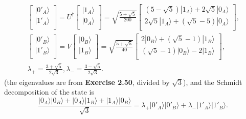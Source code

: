 \documentclass[a4paper,12pt]{article}
\newcommand{\ra}{\rangle}
\begin{document}
    \begin{gather}
        \nonumber
        \begin{bmatrix}
            | 0'_A \ra\\
            | 1'_A \ra\\
        \end{bmatrix}
        =
        U^\dagger
        \begin{bmatrix}
            | 1_A \ra\\
            | 0_A \ra\\
        \end{bmatrix}
        =
        \sqrt{ \frac{ 5 + \sqrt{5} }{200} }
        \begin{bmatrix}
            (5 - \sqrt{5}) | 1_A \ra + 2\sqrt{5} | 0_A \ra\\
            2\sqrt{5} | 1_A \ra + (\sqrt{5} - 5) | 0_A \ra\\
        \end{bmatrix} \textrm{,} \\
        \nonumber
        \begin{bmatrix}
            | 0'_B \ra\\
            | 1'_B \ra\\
        \end{bmatrix}
        =
        V
        \begin{bmatrix}
            | 0_B \ra\\
            | 1_B \ra\\
        \end{bmatrix}
        =
        \sqrt{\frac{5+\sqrt{5}}{40}}
        \begin{bmatrix}
            2 |0_B \ra + (\sqrt{5} - 1) | 1_B \ra\\
            (\sqrt{5} - 1) | 0_B \ra - 2 | 1_B \ra\\
        \end{bmatrix}
        \textrm{,}\\
        \lambda_+ = \frac{3 + \sqrt{5}}{2\sqrt{3}}, \lambda_- = \frac{3 - \sqrt{5}}{2\sqrt{3}}
        \textrm{.}
    \end{gather}
    (the eigenvalues are from \textbf{Exercise 2.50}, divided by $\sqrt{3}$), and the Schmidt decomposition of the state is
    \begin{equation}
        \frac{|0_A \ra |0_B \ra + |0_A \ra |1_B \ra + |1_A \ra |0_B \ra}{\sqrt{3}} =
        \lambda_+ |0'_A \ra |0'_B \ra + \lambda_- | 1'_A \ra | 1'_B \ra \textrm{.}
    \end{equation}
\end{document}
